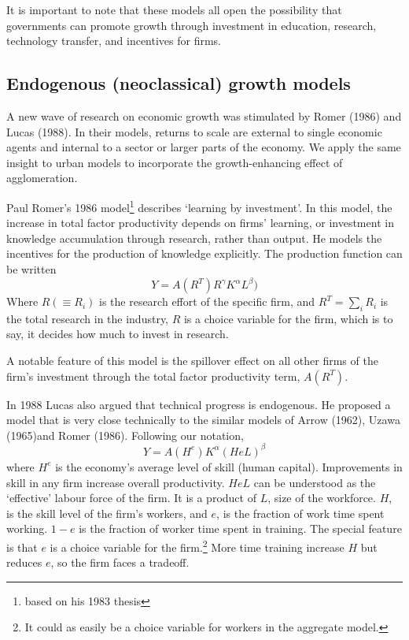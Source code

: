 It is important to note that these models all open the possibility that governments can  promote growth through investment in education, research, technology transfer, and incentives for firms.

\subsection{Endogenous (neoclassical) growth models}
A new wave of research on economic growth was stimulated by Romer (1986) and Lucas (1988). In their models, returns to scale are external to single economic agents and internal to a sector or larger parts of the economy. We apply the same insight to urban models to incorporate the growth-enhancing effect of agglomeration. 


Paul Romer's 1986  model\footnote{ based on his 1983 thesis} describes `learning by investment'. In this model, the increase in {total factor productivity} depends on firms’ learning, or investment in knowledge accumulation through research, rather than output. He models the incentives for the production of knowledge explicitly. The production function  can be written
\[Y = A(R^T)R^\gamma  K^\alpha L^\beta) \]
Where $R(\equiv R_i)$ is the research effort of the specific firm, and $R^T=\sum_iR_i$ is the total research in the industry,  $R$ is a choice variable for the firm, which is to say, it decides how much to invest in research. 

A notable feature of this model is the spillover effect on all other firms of the firm's investment through the \gls{total factor productivity} term,  $A(R^T)$. %

In 1988 Lucas also argued that technical progress is endogenous. He proposed a model that is very close technically to the similar models of Arrow (1962), Uzawa (1965)and Romer (1986). Following our notation, 
\[ Y = A(H^e) K^\alpha (HeL)^\beta \] 
where $H^e$ is the economy's average level of skill (human capital).  Improvements in skill in any firm  increase overall productivity.  $HeL$  can be understood as the `effective' labour force of the firm. It is a product of $L$, size of the workforce. $H$, is the skill level of the firm's workers, and $e$, is the fraction of work time spent working. $1-e$ is the fraction of worker time  spent in training. The  special feature is that $e$ is a choice variable for the firm.\footnote{It could as easily be a choice variable for workers in the aggregate model.} More time training increase $H$ but reduces $e$, so the firm faces a tradeoff.

